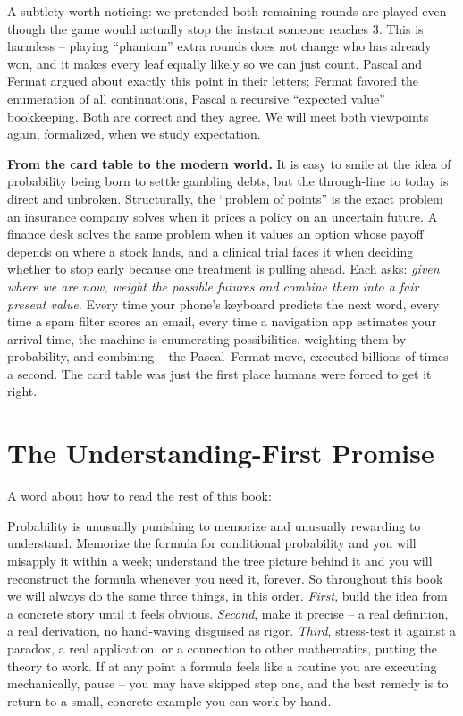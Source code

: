 \begin{remark}
A subtlety worth noticing: we pretended both remaining rounds are played even
though the game would actually stop the instant someone reaches $3$. This is
harmless -- playing ``phantom'' extra rounds does not change who has already won,
and it makes every leaf equally likely so we can just count. Pascal and Fermat
argued about exactly this point in their letters; Fermat favored the enumeration
of all continuations, Pascal a recursive ``expected value'' bookkeeping. Both are
correct and they agree. We will meet both viewpoints again, formalized, when we
study expectation.
\end{remark}

\begin{applicationbox}
\textbf{From the card table to the modern world.} It is easy to smile at the idea
of probability being born to settle gambling debts, but the through-line to today
is direct and unbroken. Structurally, the ``problem of points'' is the exact
problem an insurance company solves when it prices a policy on an uncertain
future. A finance desk solves the same problem when it values an option whose
payoff depends on where a stock lands, and a clinical trial faces it when
deciding whether to stop early because one treatment is pulling ahead. Each asks: \emph{given where
we are now, weight the possible futures and combine them into a fair present
value.} Every time your phone's keyboard predicts the next word, every time a spam
filter scores an email, every time a navigation app estimates your arrival time,
the machine is enumerating possibilities, weighting them by probability, and
combining -- the Pascal--Fermat move, executed billions of times a second. The
card table was just the first place humans were forced to get it right.
\end{applicationbox}

\section{The Understanding-First Promise}
\label{ch01:promise}

A word about how to read the rest of this book:

\begin{focusbox}
Probability is unusually punishing to memorize and unusually rewarding to
understand. Memorize the formula for conditional probability and you will misapply
it within a week; understand the tree picture behind it and you will reconstruct
the formula whenever you need it, forever. So throughout this book we will always
do the same three things, in this order. \emph{First}, build the idea from a
concrete story until it feels obvious. \emph{Second}, make it precise -- a real
definition, a real derivation, no hand-waving disguised as rigor. \emph{Third},
stress-test it against a paradox, a real application, or a connection to other
mathematics, putting the theory to work. If at any point a formula feels like a
routine you are executing mechanically, pause -- you may have skipped step one,
and the best remedy is to return to a small, concrete example you can work by hand.
\end{focusbox}

